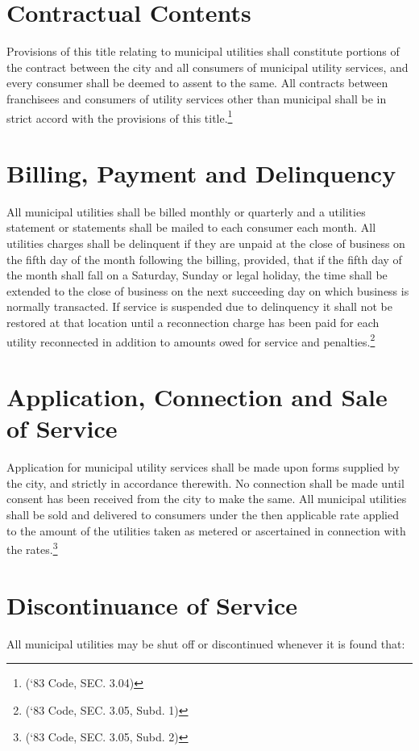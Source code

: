 \section{Contractual Contents}
Provisions of this title relating to municipal utilities shall constitute portions of the contract between the city and all consumers of municipal utility services, and every consumer shall be deemed to assent to the same.  All contracts between franchisees and consumers of utility services other than municipal shall be in strict accord with the provisions of this title.\footnote{(‘83 Code, SEC. 3.04)}\\

\setcounter{section}{14}
\section{Billing, Payment and Delinquency}
All municipal utilities shall be billed monthly or quarterly and a utilities statement or statements shall be mailed to each consumer each month.  All utilities charges shall be delinquent if they are unpaid at the close of business on the fifth day of the month following the billing, provided, that if the fifth day of the month shall fall on a Saturday, Sunday or legal holiday, the time shall be extended to the close of business on the next succeeding day on which business is normally transacted.  If service is suspended due to delinquency it shall not be restored at that location until a reconnection charge has been paid for each utility reconnected in addition to amounts owed for service and penalties.\footnote{(‘83 Code, SEC. 3.05, Subd. 1)}
\section{Application, Connection and Sale of Service}
Application for municipal utility services shall be made upon forms supplied by the city, and strictly in accordance therewith.  No connection shall be made until consent has been received from the city to make the same.  All municipal utilities shall be sold and delivered to consumers under the then applicable rate applied to the amount of the utilities taken as metered or ascertained in connection with the rates.\footnote{(‘83 Code, SEC. 3.05, Subd. 2)}

\section{Discontinuance of Service}
All municipal utilities may be shut off or discontinued whenever it is found that:
